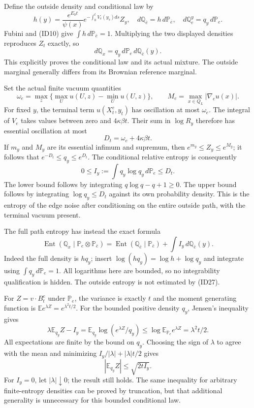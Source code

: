 \documentclass[11pt]{article}
\begin{document}
Define the outside density and conditional law by
\[
 h(y)=\frac{e^{E_0t}}{\psi(x)}
        e^{-\int_0^tV_{\bar e}(y_s)ds}Z_y,\quad
 d\mathbb Q_{\bar e}=h\,d\mathbb P_{\bar e},\quad
 d\mathbb Q_e^y=q_y\,d\mathbb P_e.
 \tag{ID23}
\]
Fubini and (ID10) give \(\int h\,d\mathbb P_{\bar e}=1\). Multiplying the two displayed densities reproduces \(Z_t\) exactly, so
\[
 d\mathbb Q_x=q_y\,d\mathbb P_e\,d\mathbb Q_{\bar e}(y).
 \tag{ID24}
\]
This explicitly proves the conditional law and its actual mixture. The outside marginal generally differs from its Brownian reference marginal.

Set the actual finite vacuum quantities
\[
 \omega_e=\max_z\{\max_Uu(U,z)-\min_Uu(U,z)\},\qquad
 M_e=\max_{x\in Q_L}|\nabla_eu(x)|.
 \tag{ID25}
\]
For fixed \(y\), the terminal term \(u(X_t^e,y_t)\) has oscillation at most \(\omega_e\). The integral of \(V_e\) takes values between zero and \(4\kappa\beta t\). Their sum in \(\log R_y\) therefore has essential oscillation at most
\[
 D_t=\omega_e+4\kappa\beta t.
 \tag{ID26}
\]
If \(m_y\) and \(M_y\) are its essential infimum and supremum, then \(e^{m_y}\le Z_y\le e^{M_y}\); it follows that \(e^{-D_t}\le q_y\le e^{D_t}\). The conditional relative entropy is consequently
\[
 0\le I_y:=\int q_y\log q_y\,d\mathbb P_e\le D_t.
 \tag{ID27}
\]
The lower bound follows by integrating \(q\log q-q+1\ge0\). The upper bound follows by integrating \(\log q_y\le D_t\) against its own probability density. This is the entropy of the edge noise after conditioning on the entire outside path, with the terminal vacuum present.

The full path entropy has instead the exact formula
\[
 \operatorname{Ent}(\mathbb Q_x\mid\mathbb P_e\otimes\mathbb P_{\bar e})
 =\operatorname{Ent}(\mathbb Q_{\bar e}\mid\mathbb P_{\bar e})
                  +\int I_y\,d\mathbb Q_{\bar e}(y).
 \tag{ID28}
\]
Indeed the full density is \(hq_y\); insert \(\log(hq_y)=\log h+\log q_y\) and integrate using \(\int q_y\,d\mathbb P_e=1\). All logarithms here are bounded, so no integrability qualification is hidden. The outside entropy is not estimated by (ID27).

For \(Z=v\cdot B_t^e\) under \(\mathbb P_e\), the variance is exactly \(t\) and the moment generating function is \(\mathbb E e^{\lambda Z}=e^{\lambda^2t/2}\). For the bounded positive density \(q_y\), Jensen's inequality gives
\[
 \lambda\mathbb E_{q_y}Z-I_y
 =\mathbb E_{q_y}\log(e^{\lambda Z}/q_y)
 \le\log\mathbb E_{\mathbb P_e}e^{\lambda Z}
 =\lambda^2t/2.
 \tag{ID29}
\]
All expectations are finite by the bound on \(q_y\). Choosing the sign of \(\lambda\) to agree with the mean and minimizing \(I_y/|\lambda|+|\lambda|t/2\) gives
\[
 |\mathbb E_{q_y}Z|\le\sqrt{2tI_y}.
 \tag{ID30}
\]
For \(I_y=0\), let \(|\lambda|\downarrow0\); the result still holds. The same inequality for arbitrary finite-entropy densities can be proved by truncation, but that additional generality is unnecessary for this bounded conditional law.
\end{document}

